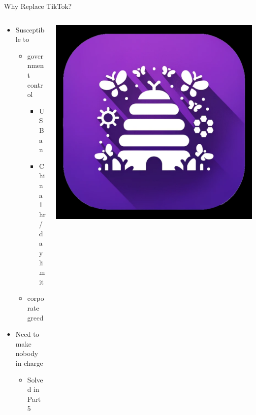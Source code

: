\documentclass[aspectratio=169]{beamer}
\begin{document}
\begin{frame}{Why Replace TikTok?}
\begin{columns}[T]
    \begin{column}[T]{0.5\textwidth}
        \begin{itemize}
            \item Susceptible to 
            \begin{itemize}
                \item government control 
                \begin{itemize}
                    \item US Ban 
                    \item China 1hr/day limit
                \end{itemize}
                \item corporate greed
            \end{itemize}
            \item Need to make nobody in charge
            \begin{itemize}
                \item Solved in Part 5
            \end{itemize}
        \end{itemize}
    \end{column}
    \begin{column}{0.5\textwidth}
        \includegraphics[height=0.8\textheight]{imgs/app_icons/2.png}
    \end{column}
\end{columns}
\end{frame}
\end{document}
